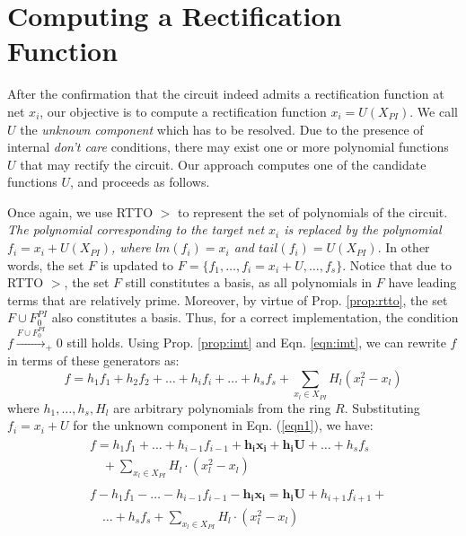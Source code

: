 \section{Computing a Rectification Function}
\label{sec:unknown}

After the confirmation that the circuit indeed admits a rectification
function at net $x_i$, our objective is to compute a rectification
function $x_i = U(X_{PI})$. We call $U$ the {\it unknown component}
which has to be resolved. Due to the presence of internal {\it don't
  care} conditions, there may exist one or more polynomial functions
$U$ that may rectify the circuit. Our approach computes one of the
candidate functions $U$, and proceeds as follows.


Once again, we use RTTO $>$ to represent the set
of polynomials of the circuit. {\it The polynomial corresponding to the
target net $x_i$ is replaced by the polynomial $f_i = x_i + U(X_{PI})$,
where $lm(f_i) = x_i$ and $tail(f_i)=U(X_{PI})$}. In other words, the
set $F$ is updated to
$F=\{f_1,\dots,f_i=x_i+U,\dots,f_s\}$. Notice that due to RTTO $>$, 
the set $F$ still constitutes a \Grobner basis, as all 
polynomials in $F$ have leading terms that are relatively
prime. Moreover, by virtue of Prop. \ref{prop:rtto}, the set $F\cup
F_{0}^{PI}$ also constitutes a \Grobner basis. 
Thus, for a correct implementation, the condition $f\xrightarrow{F\cup
  F_{0}^{PI}}_+0$ still holds. Using Prop. 
\ref{prop:imt} and Eqn. \ref{eqn:imt}, we can rewrite $f$ in terms of
these generators as:    
\vspace{-0.1in}
\begin{equation}\label{eqn1}
f = h_1f_1 + h_2f_2 + \dots+h_if_i+\dots+h_sf_s + \sum_{x_l\in X_{PI}} H_l(x_l^2-x_l)
\end{equation}
where $h_1,\dots,h_s,H_l$ are arbitrary polynomials from the ring
$R$. Substituting $f_i = x_i + U$ for the unknown component in
Eqn. (\ref{eqn1}), we have: 
\vspace{-0.08in}
\begin{eqnarray}
  \begin{split}
    & f  = h_1f_1 +\dots+h_{i-1}f_{i-1}+\bm{h_ix_i}+\bm{h_iU}+\dots+h_sf_s\\
    & \quad +\sum_{x_l\in X_{PI}} H_l \cdot(x_l^2-x_l)
  \end{split}\\  
  \begin{split}
    & f - h_1f_1 -\dots-h_{i-1}f_{i-1}-\bm{h_ix_i} = \bm{h_iU}+h_{i+1}f_{i+1}+\\
    & \quad \dots+h_sf_s +\sum_{x_l\in X_{PI}} H_l \cdot (x_l^2-x_l) \label{eqn2}
\end{split}
\end{eqnarray}

